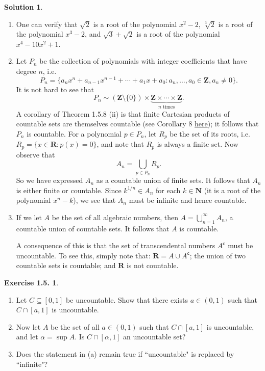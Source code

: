 \documentclass[12pt]{article}
\theoremstyle{definition}
\theoremstyle{exercise}
\newtheorem{exercise}{Exercise 1.5.}
\theoremstyle{solution}
\newtheorem*{solution}{Solution}
\newcommand{\setcomp}[1]{#1^{\mathsf{c}}}
\newcommand{\N}{\mathbf{N}}
\newcommand{\Z}{\mathbf{Z}}
\newcommand{\R}{\mathbf{R}}
\begin{document}
\begin{solution}
    \begin{enumerate}
        \item One can verify that \( \sqrt{2} \) is a root of the polynomial \( x^2 - 2 \), \( \sqrt[3]{2} \) is a root of the polynomial \( x^3 - 2 \), and \( \sqrt{3} + \sqrt{2} \) is a root of the polynomial \( x^4 - 10 x^2 + 1 \).

        \item Let \( P_n \) be the collection of polynomials with integer coefficients that have degree \( n \), i.e.\
        \[
            P_n = \{ a_n x^n + a_{n-1} x^{n-1} + \cdots + a_1 x + a_0 : a_n, \ldots, a_0 \in \Z, a_n \neq 0 \}. 
        \]
        It is not hard to see that
        \[
            P_n \sim (\Z \setminus \{ 0 \}) \times \underbrace{\Z \times \cdots \times \Z}_{n \text{ times}}.
        \]
        A corollary of Theorem 1.5.8 (ii) is that finite Cartesian products of countable sets are themselves countable (see Corollary 8 \href{https://lew98.github.io/Mathematics/Cardinality.pdf}{here}); it follows that \( P_n \) is countable. For a polynomial \( p \in P_n \), let \( R_p \) be the set of its roots, i.e.\ \( R_p = \{ x \in \R : p(x) = 0 \} \), and note that \( R_p \) is always a finite set. Now observe that
        \[
            A_n = \bigcup_{p \in P_n} R_p.
        \]
        So we have expressed \( A_n \) as a countable union of finite sets. It follows that \( A_n \) is either finite or countable. Since \( k^{1/n} \in A_n \) for each \( k \in \N \) (it is a root of the polynomial \( x^n - k \)), we see that \( A_n \) must be infinite and hence countable.

        \item If we let \( A \) be the set of all algebraic numbers, then \( A = \bigcup_{n=1}^{\infty} A_n \), a countable union of countable sets. It follows that \( A \) is countable.

        A consequence of this is that the set of transcendental numbers \( \setcomp{A} \) must be uncountable. To see this, simply note that: \( \R = A \cup \setcomp{A} \); the union of two countable sets is countable; and \( \R \) is not countable.
    \end{enumerate}
\end{solution}

\begin{exercise}
\label{ex:10}
    \begin{enumerate}
        \item Let \( C \subseteq [0, 1] \) be uncountable. Show that there exists \( a \in (0, 1) \) such that \( C \cap [a, 1] \) is uncountable.

        \item Now let \( A \) be the set of all \( a \in (0, 1) \) such that \( C \cap [a, 1] \) is uncountable, and let \( \alpha = \sup A \). Is \( C \cap [\alpha, 1] \) an uncountable set?

        \item Does the statement in (a) remain true if ``uncountable" is replaced by ``infinite"?
    \end{enumerate}
\end{exercise}
\end{document}
